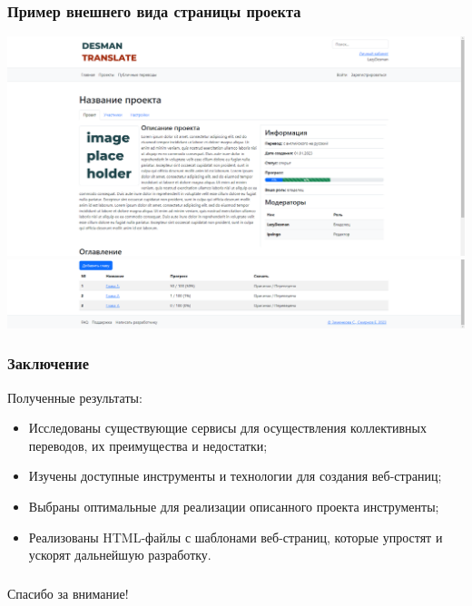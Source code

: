 \documentclass[hyperref={unicode}]{beamer}
\begin{document}
\begin{frame}
	\frametitle{Пример внешнего вида страницы проекта}
	\begin{center}
	\includegraphics[width=\textwidth]{images/projectpage1.png}
	\includegraphics[width=\textwidth]{images/projectpage2.png}
	\end{center}
\end{frame}

% 	
	
	

 \begin{frame}
 	\frametitle{Заключение}
	
 	Полученные результаты:
	
 	\begin{itemize}
 		\item Исследованы существующие сервисы для осуществления коллективных переводов, их преимущества и недостатки;
 		\item Изучены доступные инструменты и технологии для создания веб-страниц;
 		\item Выбраны оптимальные для реализации описанного проекта инструменты;
 		\item Реализованы HTML-файлы с шаблонами веб-страниц, которые упростят и ускорят дальнейшую разработку. 
 	\end{itemize}
	
\end{frame}

 \begin{frame}
 	\frametitle{}
\begin{center}
 {\Large\mbox{}Спасибо за внимание!}
\end{center}
 \end{frame}
\end{document}
